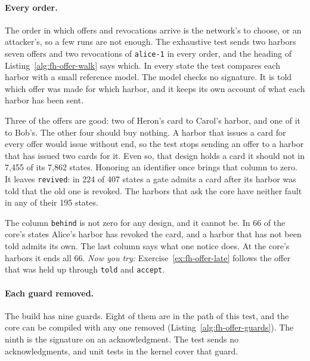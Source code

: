 \paragraph{Every order.}
The order in which offers and revocations arrive is the network's to
choose, or an attacker's, so a few runs are not enough. The exhaustive
test sends two harbors seven offers and two revocations of
\texttt{alice-1} in every order, and the heading of
Listing~\ref{alg:fh-offer-walk} says which. In every state the test
compares each harbor with a small reference model. The model checks no
signature. It is told which offer was made for which harbor, and it keeps
its own account of what each harbor has been sent.


Three of the offers are good: two of Heron's card to Carol's harbor, and
one of it to Bob's. The other four should buy nothing. A harbor that
issues a card for every offer would issue without end, so the test stops
sending an offer to a harbor that has issued two cards for it. Even so,
that design holds a card it should not in 7,455 of its 7,862 states.
Honoring an identifier once brings that column to zero. It leaves
\texttt{revived}: in 224 of 407 states a gate admits a card after its
harbor was told that the old one is revoked. The harbors that ask the
core have neither fault in any of their 195 states.

The column \texttt{behind} is not zero for any design, and it cannot be.
In 66 of the core's states Alice's harbor has revoked the card, and a
harbor that has not been told admits its own. The last column says what
one notice does. At the core's harbors it ends all 66. \emph{Now you
try:} Exercise~\ref{ex:fh-offer-late} follows the offer that was held up
through \texttt{told} and \texttt{accept}.

\paragraph{Each guard removed.}
The build has nine guards. Eight of them are in the path of this test,
and the core can be compiled with any one removed
(Listing~\ref{alg:fh-offer-guards}). The ninth is the signature on an
acknowledgment. The test sends no acknowledgments, and unit tests in the
kernel cover that guard.


